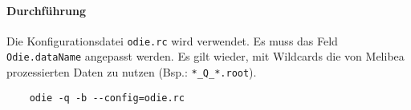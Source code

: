 \paragraph{Durchführung}%

Die Konfigurationsdatei \texttt{odie.rc} wird verwendet.
Es muss das Feld \texttt{Odie.dataName} angepasst werden.
Es gilt wieder, mit Wildcards die von Melibea prozessierten Daten zu nutzen
(Bsp.: \texttt{*\_Q\_*.root}).

\begin{lstlisting}
	odie -q -b --config=odie.rc
\end{lstlisting}
